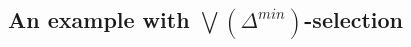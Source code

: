 \documentclass[]{article}
\newcommand{\TurnOne}[2]
    { {#1}\vdash_{\textbf{\sf 1}}  {#2}}
\newcommand{\TurnTwo}[2]
    { {#1}\vdash_{\textbf{\sf 2}}  {#2}}
\newcommand{\TurnThree}[2]
    { {#1}\vdash_{\textbf{\sf 3}}  {#2}}
\newcommand{\TurnFour}[2]
    { {#1}\vdash_{\textbf{\sf 4}}  {#2}}
\newcommand{\TurnSix}[2]
    { {#1}\vdash_{\textbf{\sf 6}}  {#2}}
\newcommand{\TurnSeven}[2]
    { {#1}\vdash_{\textbf{\sf 7}}  {#2}}
\newcommand{\TurnMarkedFiveMA}[2]
    { {#1}\vdash_{\textbf{\sf 5\XBox MA}}  {#2}}
\newcommand{\TurnMarkedEightMA}[2]
    { {#1}\vdash_{\textbf{\sf 8\XBox MA}}  {#2}}
\newcommand{\TurnNine}[2]
    { {#1}\vdash_{\textbf{\sf 9}}  {#2}}
\begin{document}
%
%
%
%
%

\subsection{An example with $\bigvee(\Delta^{min})$-selection}\label{subsec:sel-example}
\end{document}
